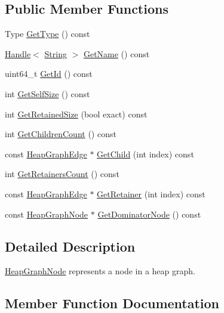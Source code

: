 \subsection*{Public Member Functions}
\begin{DoxyCompactItemize}
\item 
Type \hyperlink{classv8_1_1_heap_graph_node_a5e07fc855bded52229e62b855fa08c5d}{Get\+Type} () const 
\item 
\hyperlink{classv8_1_1_handle}{Handle}$<$ \hyperlink{classv8_1_1_string}{String} $>$ \hyperlink{classv8_1_1_heap_graph_node_af5f24ee6c07a57814e18bd317cb5576a}{Get\+Name} () const 
\item 
uint64\+\_\+t \hyperlink{classv8_1_1_heap_graph_node_a400431a5073604742b13372ad901bd78}{Get\+Id} () const 
\item 
int \hyperlink{classv8_1_1_heap_graph_node_acd3bd8860aa399ac56fa8a0229af7b85}{Get\+Self\+Size} () const 
\item 
int \hyperlink{classv8_1_1_heap_graph_node_a7fd9e0e52247c272964505c5eff41461}{Get\+Retained\+Size} (bool exact) const 
\item 
int \hyperlink{classv8_1_1_heap_graph_node_a0a49abe006755dd5536d15ae42f552d4}{Get\+Children\+Count} () const 
\item 
const \hyperlink{classv8_1_1_heap_graph_edge}{Heap\+Graph\+Edge} $\ast$ \hyperlink{classv8_1_1_heap_graph_node_ac3435611573e58b6614aeaab68442905}{Get\+Child} (int index) const 
\item 
int \hyperlink{classv8_1_1_heap_graph_node_a9de00d0733343b4b16823654813c22a1}{Get\+Retainers\+Count} () const 
\item 
const \hyperlink{classv8_1_1_heap_graph_edge}{Heap\+Graph\+Edge} $\ast$ \hyperlink{classv8_1_1_heap_graph_node_a260c115d00b7960a08ea34c6a8bee058}{Get\+Retainer} (int index) const 
\item 
const \hyperlink{classv8_1_1_heap_graph_node}{Heap\+Graph\+Node} $\ast$ \hyperlink{classv8_1_1_heap_graph_node_abdb4f9cb4fc89f5b65d3a499a6748fa7}{Get\+Dominator\+Node} () const 
\end{DoxyCompactItemize}


\subsection{Detailed Description}
\hyperlink{classv8_1_1_heap_graph_node}{Heap\+Graph\+Node} represents a node in a heap graph. 

\subsection{Member Function Documentation}
\hypertarget{classv8_1_1_heap_graph_node_ac3435611573e58b6614aeaab68442905}{}
